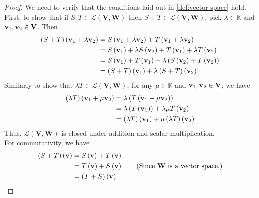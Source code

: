 \begin{proof}
    We need to verify that the conditions laid out in \cref{def:vector-space} hold.\\ 
    First, to show that if \( S,T \in   \mathcal{L} \left( \mathbf{V}, \mathbf{W} \right)\) then \( S+T \in   \mathcal{L} \left( \mathbf{V}, \mathbf{W} \right)\), pick \( \lambda \in \mathbb{K} \) and \( \vb{v}_{1}, \vb{v}_{2} \in \mathbf{V} \). Then 
    \begin{align*}
        \left( S+T \right) \left( \vb{v}_{1} + \lambda \vb{v}_{2} \right) &= S \left( \vb{v}_{1} + \lambda \vb{v}_{2} \right) + T \left( \vb{v}_{1} + \lambda \vb{v}_{2} \right) \\
        &= S \left( \vb{v}_{1} \right) + \lambda S \left( \vb{v}_{2} \right) + T \left( \vb{v}_{1} \right) + \lambda T \left( \vb{v}_{2} \right) \\
        &= S \left( \vb{v}_{1} \right) + T \left( \vb{v}_{1} \right) + \lambda \left( S \left( \vb{v}_{2} \right) + T \left( \vb{v}_{2} \right) \right) \\
        &= \left( S+T \right)\left( \vb{v}_{1} \right) + \lambda  \left( S+T \right)\left( \vb{v}_{2} \right)
    \end{align*}
    Similarly to show that \( \lambda T \in \mathcal{L} \left( \mathbf{V}, \mathbf{W} \right) \), for any \( \mu \in \mathbb{K} \) and \( \vb{v}_{1}, \vb{v}_{2} \in \mathbf{V} \), we have 
    \begin{align*}
        \left( \lambda T \right) \left( \vb{v}_{1} + \mu \vb{v}_{2} \right) &= \lambda \left( T  \left( \vb{v}_{1} + \mu \vb{v}_{2} \right) \right) \\
        &= \lambda \left( T \left( \vb{v}_{1} \right) \right) + \lambda \mu T \left( \vb{v}_{2} \right) \\
        &=\left( \lambda T \right) \left( \vb{v}_{1} \right) + \mu \left( \lambda T \right) \left( \vb{v}_{2} \right)
    \end{align*}
    Thus, \( \mathcal{L} \left( \mathbf{V}, \mathbf{W} \right) \) is closed under addition and scalar multiplication. \\ 
    For commutativity, we have 
    \begin{align*}
        \left( S + T \right) \left( \vb{v} \right) &= S \left( \vb{v} \right) + T \left( \vb{v} \right) \\
        &= T \left( \vb{v} \right) + S \left( \vb{v} \right) \tag{Since $\mathbf{W}$ is a vector space.} \\
        &= \left( T + S\right) \left( \vb{v} \right)

\end{align*}
\end{proof}
